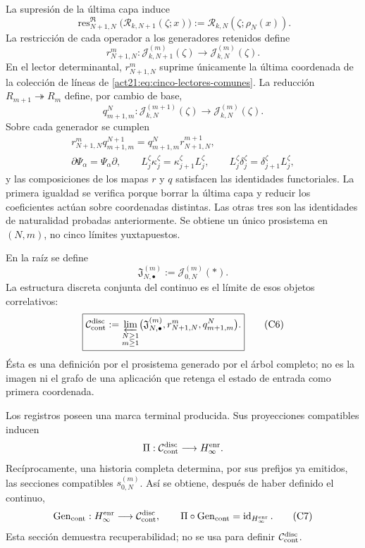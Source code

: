 La supresión de la última capa induce
\[
 \operatorname{res}^{\mathfrak R}_{N+1,N}
 \bigl(\mathscr R_{k,N+1}(\zeta;x)\bigr)
 :=\mathscr R_{k,N}(\zeta;\rho_N(x)).
\]
La restricción de cada operador a los generadores retenidos define
\[
 r^m_{N+1,N}:\mathcal J_{k,N+1}^{(m)}(\zeta)
 \longrightarrow\mathcal J_{k,N}^{(m)}(\zeta).
\]
En el lector determinantal, \(r^m_{N+1,N}\) suprime únicamente la última
coordenada de la colección de líneas de
\eqref{act21:eq:cinco-lectores-comunes}. La reducción
\(R_{m+1}\twoheadrightarrow R_m\) define, por cambio de base,
\[
 q^N_{m+1,m}:\mathcal J_{k,N}^{(m+1)}(\zeta)
 \longrightarrow\mathcal J_{k,N}^{(m)}(\zeta).
\]
Sobre cada generador se cumplen
\[
\begin{gathered}
 r^m_{N+1,N}q^{N+1}_{m+1,m}
 =q^N_{m+1,m}r^{m+1}_{N+1,N},\\
 \partial\Psi_\alpha=\Psi_\alpha\partial,
 \qquad L_j^\zeta\kappa_j^\zeta
       =\kappa_{j+1}^\zeta L_j^\zeta,
 \qquad L_j^\zeta\delta_j^\zeta
       =\delta_{j+1}^\zeta L_j^\zeta,
\end{gathered}
\tag{C4}
\label{act21:eq:naturalidad-D}
\]
y las composiciones de los mapas \(r\) y \(q\) satisfacen las identidades
functoriales. La primera igualdad se verifica porque borrar la última capa y
reducir los coeficientes actúan sobre coordenadas distintas. Las otras tres
son las identidades de naturalidad probadas anteriormente. Se obtiene un único
prosistema en \((N,m)\), no cinco límites yuxtapuestos.

En la raíz se define
\[
 \mathfrak J_{N,\bullet}^{(m)}:=\mathcal J_{0,N}^{(m)}(\ast).
\tag{C5}
\label{act21:eq:fibras-conjuntas-horizonte}
\]
La estructura discreta conjunta del continuo es el límite de esos objetos
correlativos:
\[
 \boxed{
 \mathcal C_{\rm cont}^{\rm disc}
 :=\varprojlim_{\substack{N\geq1\\m\geq1}}
   \bigl(\mathfrak J_{N,\bullet}^{(m)},
         r^m_{N+1,N},q^N_{m+1,m}\bigr).}
\tag{C6}
\label{act21:eq:continuo-discreto}
\]
Ésta es una definición por el prosistema generado por el árbol completo; no es
la imagen ni el grafo de una aplicación que retenga el estado de entrada como
primera coordenada.

Los registros poseen una marca terminal producida. Sus proyecciones compatibles
inducen
\[
 \Pi:\mathcal C_{\rm cont}^{\rm disc}\longrightarrow H_\infty^{\rm enr}.
\]
Recíprocamente, una historia completa determina, por sus prefijos ya emitidos,
las secciones compatibles \(s_{0,N}^{(m)}\). Así se obtiene, después de haber
definido el continuo,
\[
 \operatorname{Gen}_{\rm cont}:H_\infty^{\rm enr}
 \longrightarrow\mathcal C_{\rm cont}^{\rm disc},
 \qquad
 \Pi\circ\operatorname{Gen}_{\rm cont}
 =\operatorname{id}_{H_\infty^{\rm enr}}.
\tag{C7}
\label{act21:eq:seccion-historias-continuo}
\]
Esta sección demuestra recuperabilidad; no se usa para definir
\(\mathcal C_{\rm cont}^{\rm disc}\).

